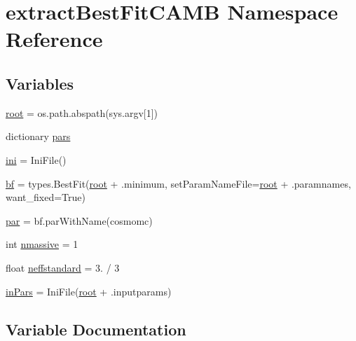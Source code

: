 \hypertarget{namespaceextractBestFitCAMB}{}\section{extract\+Best\+Fit\+C\+A\+MB Namespace Reference}
\label{namespaceextractBestFitCAMB}
\subsection*{Variables}
\begin{DoxyCompactItemize}
\item 
\mbox{\hyperlink{namespaceextractBestFitCAMB_a92ac932489427bc065e81b7429fcc584}{root}} = os.\+path.\+abspath(sys.\+argv\mbox{[}1\mbox{]})
\item 
dictionary \mbox{\hyperlink{namespaceextractBestFitCAMB_a8b338b944ce58dab8a83f854a0920340}{pars}}
\item 
\mbox{\hyperlink{namespaceextractBestFitCAMB_ae8ff10349285b6fc035b5d08319593aa}{ini}} = Ini\+File()
\item 
\mbox{\hyperlink{namespaceextractBestFitCAMB_afc97fe708947b17ceb1f77c3d5408035}{bf}} = types.\+Best\+Fit(\mbox{\hyperlink{namespaceextractBestFitCAMB_a92ac932489427bc065e81b7429fcc584}{root}} + \textquotesingle{}.minimum\textquotesingle{}, set\+Param\+Name\+File=\mbox{\hyperlink{namespaceextractBestFitCAMB_a92ac932489427bc065e81b7429fcc584}{root}} + \textquotesingle{}.paramnames\textquotesingle{}, want\+\_\+fixed=True)
\item 
\mbox{\hyperlink{namespaceextractBestFitCAMB_a9dff1c182f41289b8b8941cbd390a115}{par}} = bf.\+par\+With\+Name(cosmomc)
\item 
int \mbox{\hyperlink{namespaceextractBestFitCAMB_a5eea628813c76bf94a8c661e660c2bd1}{nmassive}} = 1
\item 
float \mbox{\hyperlink{namespaceextractBestFitCAMB_af81cedf8e7971cd99cfb81f897d2dfec}{neffstandard}} = 3. / 3
\item 
\mbox{\hyperlink{namespaceextractBestFitCAMB_af20363a89ff706a1c9fbd382dfbeb90a}{in\+Pars}} = Ini\+File(\mbox{\hyperlink{namespaceextractBestFitCAMB_a92ac932489427bc065e81b7429fcc584}{root}} + \textquotesingle{}.inputparams\textquotesingle{})
\end{DoxyCompactItemize}


\subsection{Variable Documentation}
\mbox{\label{namespaceextractBestFitCAMB_afc97fe708947b17ceb1f77c3d5408035}} 
